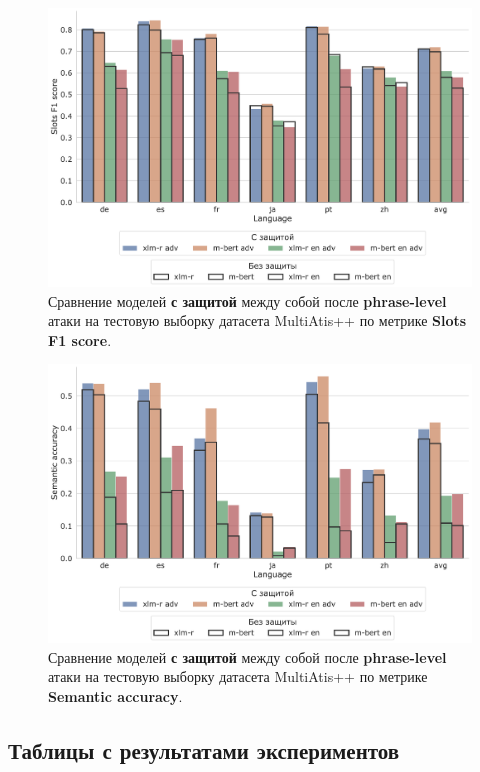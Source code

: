 \begin{figure}[H]
    \centering
    \includegraphics[width=\textwidth]{images/16}
    \caption{Сравнение моделей \textbf{с защитой} между собой после \textbf{phrase-level} атаки на тестовую выборку датасета MultiAtis++ по метрике \textbf{Slots F1 score}.}\label{fig:figure16}
\end{figure}
\begin{figure}[H]
    \centering
    \includegraphics[width=\textwidth]{images/17}
    \caption{Сравнение моделей \textbf{с защитой} между собой после \textbf{phrase-level} атаки на тестовую выборку датасета MultiAtis++ по метрике \textbf{Semantic accuracy}.}\label{fig:figure17}
\end{figure}

\newpage

\subsection{Таблицы с результатами экспериментов}\label{subsec:tables}







